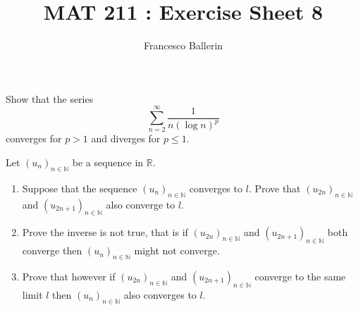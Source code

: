\documentclass[11pt]{article}%
\title{MAT 211 : Exercise Sheet 8}
\author{Francesco Ballerin}
\date{\color{gray}{\small{francesco.ballerin@uib.no}}}
\begin{document}
\begin{minipage}[t]{\dimexpr \textwidth-6cm-\columnsep}
     \maketitle
\end{minipage}
\hfill\noindent{}

\vspace{50pt}



\begin{Exercise}[title=**] Show that the series 
$$
\sum_{n=2}^{\infty}\frac{1}{n(\log n)^p} 
$$
converges for $p>1$ and diverges for $p\leq 1$.
\end{Exercise}


\begin{Exercise}[title=**$\dagger$]
Let $(u_n)_{n\in\mathbb{N}}$ be a sequence in $\mathbb{R}$.
\begin{enumerate}
	\item Suppose that the sequence $(u_n)_{n\in\mathbb{N}}$ converges to $l$. Prove that $(u_{2n})_{n\in\mathbb{N}}$ and $(u_{2n+1})_{n\in\mathbb{N}}$ also converge to $l$. 
	\item Prove the inverse is not true, that is if $(u_{2n})_{n\in\mathbb{N}}$ and $(u_{2n+1})_{n\in\mathbb{N}}$ both converge then $(u_n)_{n\in\mathbb{N}}$ might not converge.
	\item Prove that however if $(u_{2n})_{n\in\mathbb{N}}$ and $(u_{2n+1})_{n\in\mathbb{N}}$ converge to the same limit $l$ then $(u_n)_{n\in\mathbb{N}}$ also converges to $l$.
\end{enumerate}
\end{Exercise}
\newpage
\end{document}
